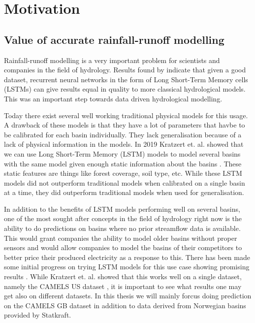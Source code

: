 \section{Motivation}
\subsection{Value of accurate rainfall-runoff modelling}
Rainfall-runoff modelling is a very important problem for scientists and 
companies in the field of hydrology.
Results found by \cite{lstm_first_paper} indicate that given a good dataset,
recurrent neural networks in the form of Long Short-Term Memory cells (LSTMs)
can give results equal in quality to more classical hydrological models.
This was an important step towards data driven hydrological modelling. 

Today there exist several well working traditional physical models for this usage. \citationneeded
A drawback of these models is that they have a lot of parameters that havbe to be 
calibrated for each basin individually. They lack generalisation because of a lack of 
physical information in the models. \citationneeded In 2019 Kratzert et. al. showed
that we can use Long Short-Term Memory (LSTM) models to model several basins with the same model
given enough static information about the basins \cite{lstm_second_paper}. These 
static features are things like forest coverage, soil type, etc. While these LSTM 
models did not outperform traditional models when calibrated on a single basin at 
a time, they did outperform traditional models when used for generalisation.

In addition to the benefits of LSTM models performing well on several basins, 
one of the most sought after concepts in the field of hydrology right now is the 
ability to do predictions on basins where no prior streamflow data is available. 
This would grant companies the ability to model older basins without proper sensors
and would allow companies to model the basins of their competitors to better price 
their produced electricity as a response to this. There has been made some initial 
progress on trying LSTM models for this use case showing promising results \cite{lstm_third_paper}.
While Kratzert et. al. showed that this works well on a single dataset, namely the 
CAMELS US dataset \cite{CAMELS_US}, it is important to see what results one may get 
also on different datasets. In this thesis we will mainly forcus doing prediction on 
the CAMELS GB dataset \cite{CAMELS_GB} in addition to data derived from Norwegian basins provided by 
Statkraft.

